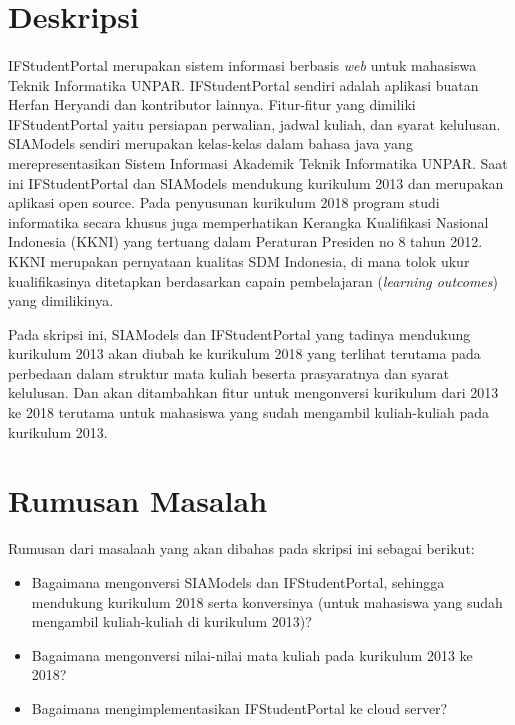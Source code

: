 \documentclass[a4paper,twoside]{article}
\begin{document}
\title{\@judultopik}
\author{\nama \textendash \@npm} 

\newcommand{\nama}{Andrianto Sugiarto}
\newcommand{\@npm}{2013730046}
\newcommand{\@judultopik}{Migrasi SIAModels dan IFStudentPortal ke Kurikulum 2018} %
\newcommand{\jumpemb}{1} %
\newcommand{\tanggal}{14/02/2018}
\maketitle


\section{Deskripsi}

\paragraph{} IFStudentPortal merupakan sistem informasi berbasis \textit{web} untuk mahasiswa Teknik Informatika UNPAR. IFStudentPortal sendiri adalah aplikasi buatan Herfan Heryandi dan kontributor lainnya. Fitur-fitur yang dimiliki IFStudentPortal yaitu persiapan perwalian, jadwal kuliah, dan syarat kelulusan. SIAModels sendiri merupakan kelas-kelas dalam bahasa java yang merepresentasikan Sistem Informasi Akademik Teknik Informatika UNPAR. Saat ini IFStudentPortal dan SIAModels mendukung kurikulum 2013 dan merupakan aplikasi open source. Pada penyusunan kurikulum 2018 program studi informatika secara khusus juga memperhatikan Kerangka Kualifikasi Nasional Indonesia (KKNI) yang tertuang dalam Peraturan Presiden no 8 tahun 2012. KKNI merupakan pernyataan kualitas SDM Indonesia, di mana tolok ukur kualifikasinya ditetapkan berdasarkan capain pembelajaran (\textit{learning outcomes}) yang dimilikinya.

Pada skripsi ini, SIAModels dan IFStudentPortal yang tadinya mendukung kurikulum 2013 akan diubah ke kurikulum 2018 yang terlihat terutama pada perbedaan dalam struktur mata kuliah beserta prasyaratnya dan syarat kelulusan. Dan akan ditambahkan fitur untuk mengonversi kurikulum dari 2013 ke 2018 terutama untuk mahasiswa yang sudah mengambil kuliah-kuliah pada kurikulum 2013.


\section{Rumusan Masalah}
Rumusan dari masalaah yang akan dibahas pada skripsi ini sebagai berikut:
\begin{itemize}
	\item Bagaimana mengonversi SIAModels dan IFStudentPortal, sehingga mendukung kurikulum 2018 serta konversinya (untuk mahasiswa yang sudah mengambil kuliah-kuliah di kurikulum 2013)?
	\item Bagaimana mengonversi nilai-nilai mata kuliah pada kurikulum 2013 ke 2018?
	\item Bagaimana mengimplementasikan IFStudentPortal ke cloud server?
\end{itemize}
\end{document}
